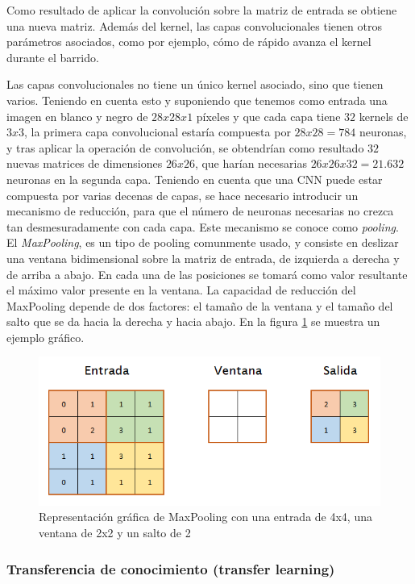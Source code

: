Como resultado de aplicar la convolución sobre la matriz de entrada se obtiene una nueva matriz. Además del kernel, las capas convolucionales tienen otros parámetros asociados, como por ejemplo, cómo de rápido avanza el kernel durante el barrido.

Las capas convolucionales no tiene un único kernel asociado, sino que tienen varios. Teniendo en cuenta esto y suponiendo que tenemos como entrada una imagen en blanco y negro de $28x28x1$ píxeles y que cada capa tiene $32$ kernels de $3x3$, la primera capa convolucional estaría compuesta por $28 x 28 = 784$ neuronas, y tras aplicar la operación de convolución, se obtendrían como resultado $32$ nuevas matrices de dimensiones $26 x 26$, que harían necesarias $26 x 26 x 32 = 21.632$ neuronas en la segunda capa. Teniendo en cuenta que una CNN puede estar compuesta por varias decenas de capas, se hace necesario introducir un mecanismo de reducción, para que el número de neuronas necesarias no crezca tan desmesuradamente con cada capa. Este mecanismo se conoce como \textit{pooling}. El \textit{MaxPooling}, es un tipo de pooling comunmente usado, y consiste en deslizar una ventana bidimensional sobre la matriz de entrada, de izquierda a derecha y de arriba a abajo. En cada una de las posiciones se tomará como valor resultante el máximo valor presente en la ventana. La capacidad de reducción del MaxPooling depende de dos factores: el tamaño de la ventana y el tamaño del salto que se da hacia la derecha y hacia abajo. En la figura \ref{fig:cnn_maxpooling} se muestra un ejemplo gráfico.

\begin{figure}[H]
	\centering
	\includegraphics[width=0.7\linewidth]{images/maxpooling_example.png}
	\caption{Representación gráfica de MaxPooling con una entrada de 4x4, una ventana de 2x2 y un salto de 2}
	\label{fig:cnn_maxpooling}
\end{figure}

\subsubsection*{Transferencia de conocimiento (transfer learning)}

